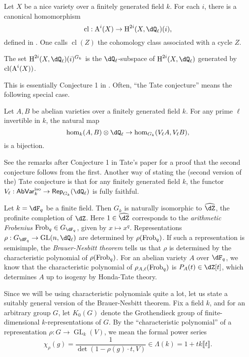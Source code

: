 Let $X$ be a nice variety over a finitely generated field $k$. For each $i$, 
there is a canonical homomorphism 
\[
  \operatorname{cl}:\chow^i(X) \to \h^{2 i}(X,\dQ_\ell)(i)\text{,}
\]
defined in \cite[VI 2.2.10]{de77}. One calls $\operatorname{cl}(Z)$ the 
cohomology class associated with a cycle $Z$. 

\begin{conjecture}[Tate]
The set $\h^{2 i}(X,\dQ_\ell)(i)^{G_k}$ is the $\dQ_\ell$-subspace of $\h^{2 i}(X,\dQ_\ell)$ 
generated by $\operatorname{cl}(\operatorname{A}^i(X))$. 
\end{conjecture}

This is essentially Conjecture 1 in \cite{ta65}. Often, ``the Tate conjecture'' 
means the following special case. 

\begin{conjecture}[Tate]
Let $A,B$ be abelian varieties over a finitely generated field $k$. For any 
prime $\ell$ invertible in $k$, the natural map 
\[
  \hom_k(A,B)\otimes\dQ_\ell \to \hom_{G_k}(V_\ell A, V_\ell B) \text{,}
\]
is a bijection. 
\end{conjecture}

See the remarks after Conjecture 1 in Tate's paper for a proof that the second 
conjecture follows from the first. Another way of stating the (second version 
of the) Tate conjecture is that for any finitely generated field $k$, the 
functor $V_\ell:\mathsf{AbVar}_k^\text{iso} \to \mathsf{Rep}_{G_k}(\dQ_\ell)$ 
is fully faithful. 

\begin{example}
Let $k=\dF_q$ be a finite field. Then $G_k$ is naturally isomorphic to 
$\widehat\dZ$, the profinite completion of $\dZ$. Here $1\in \widehat\dZ$ 
corresponds to the \emph{arithmetic Frobenius} $\frob_q\in G_{\dF_q}$, given by 
$x\mapsto x^q$. Representations 
$\rho:G_{\dF_q} \to \gl{n}{\dQ_\ell}$ are determined by 
$\rho(\mathrm{Frob}_q)$. If such a representation is semisimple, the 
\emph{Brauer-Nesbitt theorem} tells us that $\rho$ is determined by the 
characteristic polynomial of $\rho(\mathrm{Frob}_q)$. For an abelian variety $A$ over 
$\dF_q$, we know that the characteristic polynomial of 
$\rho_{A,\ell}(\mathrm{Frob}_q)$ is $P_A(t)\in \dZ[t]$, which determines $A$ up to 
isogeny by Honda-Tate theory. 
\end{example}

Since we will be using characteristic polynomials quite a lot, let us state a 
suitably general version of the Brauer-Nesbitt theorem. Fix a field $k$, and 
for an arbitrary group $G$, let $K_0(G)$ denote the Grothendieck group of 
finite-dimensional $k$-representations of $G$. By the ``characteristic 
polynomial'' of a representation $\rho:G \to \operatorname{GL}_k(V)$, we mean 
the formal power series 
\[
  \chi_\rho(g) = \frac{1}{\det(1-\rho(g)\cdot t, V)} \in \Lambda(k) = 1+t k\llbracket t\rrbracket \text{.}
\]

